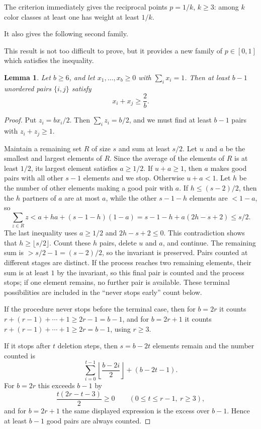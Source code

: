 \documentclass[12pt]{article}
\newtheorem{lemma}{Lemma}
\newcommand{\review}[1]{\begin{reviewbox}#1\end{reviewbox}}
\begin{document}
The criterion immediately gives the reciprocal points \(p=1/k\), \(k\ge3\):
among \(k\) color classes at least one has weight at least \(1/k\).

It also gives the following second family.

\review{
    This result is not too difficult to prove, but it provides a new family of $p \in [0, 1]$ which satisfies the inequality. 
}
\begin{lemma}\label{lem:pairs}
Let \(b\ge6\), and let \(x_1,\ldots,x_b\ge0\) with \(\sum_i x_i=1\).  Then at
least \(b-1\) unordered pairs \(\{i,j\}\) satisfy
\[
       x_i+x_j\ge \frac2b .
\]
\end{lemma}

\begin{proof}
Put \(z_i=bx_i/2\).  Then \(\sum_i z_i=b/2\), and we must find at least
\(b-1\) pairs with \(z_i+z_j\ge1\).

Maintain a remaining set \(R\) of size \(s\) and sum at least \(s/2\).  Let
\(u\) and \(a\) be the smallest and largest elements of \(R\).  Since the
average of the elements of \(R\) is at least \(1/2\), its largest element
satisfies \(a\ge1/2\).  If \(u+a\ge1\), then \(a\) makes good pairs with all
other \(s-1\) elements and we stop.  Otherwise \(u+a<1\).  Let \(h\) be the
number of other elements making a good pair with \(a\).  If \(h\le(s-2)/2\),
then the \(h\) partners of \(a\) are at most \(a\), while the other \(s-1-h\)
elements are \(<1-a\), so
\[
 \sum_{z\in R}z
   < a+ha+(s-1-h)(1-a)
   =s-1-h+a(2h-s+2)\le s/2.
\]
The last inequality uses \(a\ge1/2\) and \(2h-s+2\le0\).  This contradiction
shows that \(h\ge\lfloor s/2\rfloor\).  Count these \(h\) pairs, delete \(u\)
and \(a\), and continue.  The remaining sum is
\(>s/2-1=(s-2)/2\), so the invariant is preserved.  Pairs counted at different
stages are distinct.  If the process reaches two remaining elements, their sum is
at least \(1\) by the invariant, so this final pair is counted and the process
stops; if one element remains, no further pair is available.  These terminal
possibilities are included in the ``never stops early'' count below.

If the procedure never stops before the terminal case, then for \(b=2r\) it
counts
\(r+(r-1)+\cdots+1\ge2r-1=b-1\), and for \(b=2r+1\) it counts
\(r+(r-1)+\cdots+1\ge2r=b-1\), using \(r\ge3\).

If it stops after \(t\) deletion steps, then \(s=b-2t\) elements remain and the
number counted is
\[
       \sum_{i=0}^{t-1}\left\lfloor \frac{b-2i}{2}\right\rfloor+(b-2t-1).
\]
For \(b=2r\) this exceeds \(b-1\) by
\[
       \frac{t(2r-t-3)}{2}\ge0\qquad(0\le t\le r-1,\ r\ge3),
\]
and for \(b=2r+1\) the same displayed expression is the excess over \(b-1\).
Hence at least \(b-1\) good pairs are always counted.
\end{proof}
\end{document}
